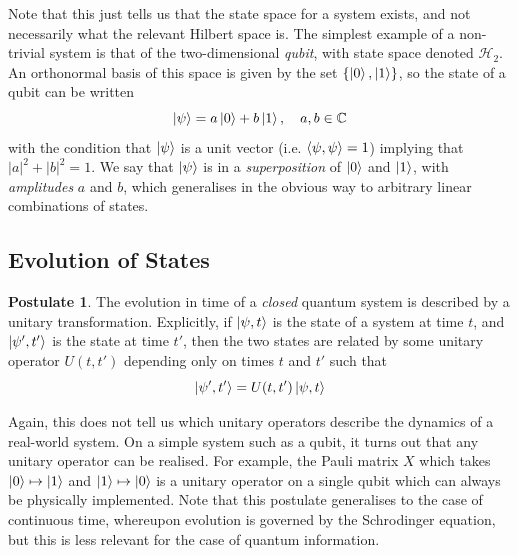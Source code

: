 \documentclass[12pt,a4paper]{report}
\numberwithin{equation}{section}
\theoremstyle{definition}
\theoremstyle{theorem}
\theoremstyle{theorem}
\theoremstyle{example}
\theoremstyle{definition}
\newtheorem{postulate}{Postulate}
\begin{document}
Note that this just tells us that the state space for a system exists, and not necessarily what the relevant Hilbert space is. The simplest example of a non-trivial system is that of the two-dimensional \textit{qubit}, with state space denoted $\mathcal{H}_{2}$. An orthonormal basis of this space is given by the set $\{\ket{0},\ket{1}\}$, so the state of a qubit can be written
\begin{equation}
	\ket{\psi}=a\ket{0}+b\ket{1},\quad a,b\in\mathbb{C}
\end{equation} 
with the condition that $\ket{\psi}$ is a unit vector (i.e. $\braket{\psi,\psi}=1$) implying that $|a|^{2}+|b|^{2}=1$. We say that $\ket{\psi}$ is in a \textit{superposition} of $\ket{0}$ and $\ket{1}$, with \textit{amplitudes} $a$ and $b$, which generalises in the obvious way to arbitrary linear combinations of states.

\subsection{Evolution of States}
\begin{postulate}
	The evolution in time of a \textit{closed} quantum system is described by a unitary transformation. Explicitly, if $\ket{\psi,t}$ is the state of a system at time $t$, and $\ket{\psi',t'}$ is the state at time $t'$, then the two states are related by some unitary operator $U(t,t')$ depending only on times $t$ and $t'$ such that
	\begin{equation}
		\ket{\psi',t'}=U(t,t')\ket{\psi,t}
	\end{equation}
\end{postulate}
Again, this does not tell us which unitary operators describe the dynamics of a real-world system. On a simple system such as a qubit, it turns out that any unitary operator can be realised. For example, the Pauli matrix $X$ which takes $\ket{0}\mapsto\ket{1}$ and $\ket{1}\mapsto\ket{0}$ is a unitary operator on a single qubit which can always be physically implemented. Note that this postulate generalises to the case of continuous time, whereupon evolution is governed by the Schrodinger equation, but this is less relevant for the case of quantum information.
\end{document}
